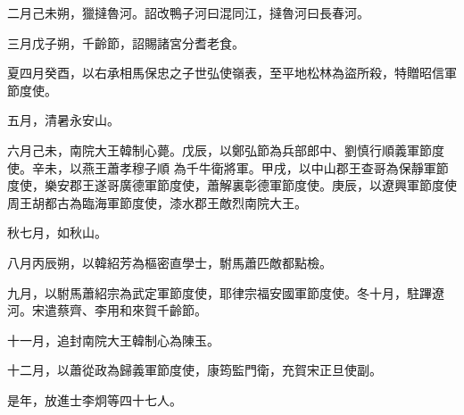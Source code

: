 \begin{pinyinscope}
 二月己未朔，獵撻魯河。詔改鴨子河曰混同江，撻魯河曰長春河。



 三月戊子朔，千齡節，詔賜諸宮分耆老食。



 夏四月癸酉，以右承相馬保忠之子世弘使嶺表，至平地松林為盜所殺，特贈昭信軍節度使。



 五月，清暑永安山。



 六月己未，南院大王韓制心薨。戊辰，以鄭弘節為兵部郎中、劉慎行順義軍節度使。辛未，以燕王蕭孝穆子順
 為千牛衛將軍。甲戌，以中山郡王查哥為保靜軍節度使，樂安郡王遂哥廣德軍節度使，蕭解裏彰德軍節度使。庚辰，以遼興軍節度使周王胡都古為臨海軍節度使，漆水郡王敵烈南院大王。



 秋七月，如秋山。



 八月丙辰朔，以韓紹芳為樞密直學士，駙馬蕭匹敵都點檢。



 九月，以駙馬蕭紹宗為武定軍節度使，耶律宗福安國軍節度使。冬十月，駐蹕遼河。宋遣蔡齊、李用和來賀千齡節。



 十一月，追封南院大王韓制心為陳玉。



 十二月，以蕭從政為歸義軍節度使，康筠監門衛，充賀宋正旦使副。



 是年，放進士李炯等四十七人。



\end{pinyinscope}